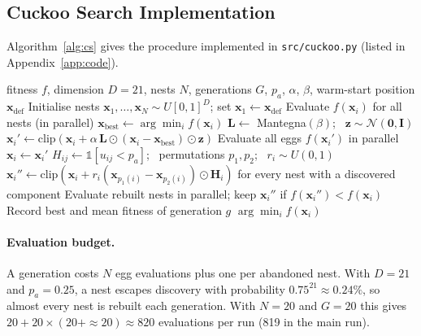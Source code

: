 \documentclass[12pt,a4paper]{article}
\numberwithin{equation}{section}
\numberwithin{table}{section}
\numberwithin{figure}{section}
\begin{document}
\subsection{Cuckoo Search Implementation}
Algorithm~\ref{alg:cs} gives the procedure implemented in \texttt{src/cuckoo.py} (listed in Appendix~\ref{app:code}).

\begin{algorithm}[H]
\caption{Cuckoo Search for joint SVR tuning and feature selection}
\label{alg:cs}
\begin{algorithmic}[1]
\Require fitness $f$, dimension $D = 21$, nests $N$, generations $G$, $p_a$, $\alpha$, $\beta$, warm-start position $\mathbf{x}_{\text{def}}$
\State Initialise nests $\mathbf{x}_1,\dots,\mathbf{x}_N \sim U[0,1]^D$; set $\mathbf{x}_1 \gets \mathbf{x}_{\text{def}}$ 
\State Evaluate $f(\mathbf{x}_i)$ for all nests (in parallel)
  \State $\mathbf{x}_{\text{best}} \gets \arg\min_i f(\mathbf{x}_i)$ 
   
    \State $\mathbf{L} \gets$ Mantegna$(\beta)$; \ $\mathbf{z} \sim \mathcal{N}(\mathbf{0},\mathbf{I})$
    \State $\mathbf{x}_i' \gets \mathrm{clip}(\mathbf{x}_i + \alpha\, \mathbf{L} \odot (\mathbf{x}_i - \mathbf{x}_{\text{best}}) \odot \mathbf{z})$
  \EndFor
  \State Evaluate all eggs $f(\mathbf{x}_i')$ in parallel
   
     \ $\mathbf{x}_i \gets \mathbf{x}_i'$ \EndIf
  \EndFor
  \State $H_{ij} \gets \mathbb{1}[u_{ij} < p_a]$; \ permutations $p_1, p_2$; \ $r_i \sim U(0,1)$ 
  \State $\mathbf{x}_i'' \gets \mathrm{clip}(\mathbf{x}_i + r_i (\mathbf{x}_{p_1(i)} - \mathbf{x}_{p_2(i)}) \odot \mathbf{H}_i)$ for every nest with a discovered component
  \State Evaluate rebuilt nests in parallel; keep $\mathbf{x}_i''$ if $f(\mathbf{x}_i'') < f(\mathbf{x}_i)$
  \State Record best and mean fitness of generation $g$
\EndFor
\State \Return $\arg\min_i f(\mathbf{x}_i)$
\end{algorithmic}
\end{algorithm}

\paragraph{Evaluation budget.} A generation costs $N$ egg evaluations plus one per abandoned nest. With $D = 21$ and $p_a = 0.25$, a nest escapes discovery with probability $0.75^{21} \approx 0.24\%$, so almost every nest is rebuilt each generation. With $N = 20$ and $G = 20$ this gives $20 + 20 \times (20 + {\approx}20) \approx 820$ evaluations per run (819 in the main run).
\end{document}
